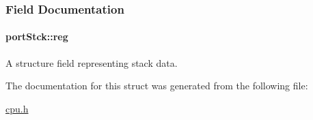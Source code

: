 \subsubsection{Field Documentation}
\hypertarget{structportStck_a52e715773895c635b3e8ddb30d582d9c}{
\paragraph[{reg}]{ port\-Stck\-::reg}}\label{structportStck_a52e715773895c635b3e8ddb30d582d9c}


A structure field representing stack data. 



The documentation for this struct was generated from the following file\-:\begin{DoxyCompactItemize}
\item 
\hyperlink{cpu_8h}{cpu.\-h}\end{DoxyCompactItemize}

